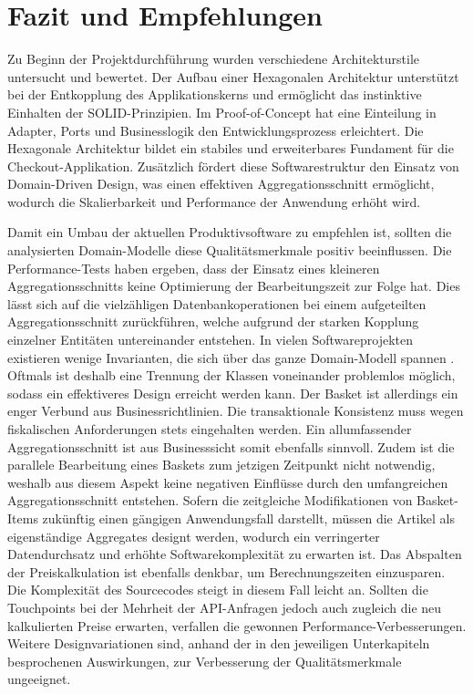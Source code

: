 

\chapter{Fazit und Empfehlungen}

Zu Beginn der Projektdurchführung wurden verschiedene Architekturstile untersucht und bewertet. Der Aufbau einer Hexagonalen Architektur unterstützt bei der Entkopplung des Applikationskerns und ermöglicht das instinktive Einhalten der SOLID-Prinzipien. Im Proof-of-Concept hat eine Einteilung in Adapter, Ports und Businesslogik den Entwicklungsprozess erleichtert. Die Hexagonale Architektur bildet ein stabiles und erweiterbares Fundament für die Checkout-Applikation. Zusätzlich fördert diese Softwarestruktur den Einsatz von Domain-Driven Design, was einen effektiven Aggregationsschnitt ermöglicht, wodurch die Skalierbarkeit und Performance der Anwendung erhöht wird. 

Damit ein Umbau der aktuellen Produktivsoftware zu empfehlen ist, sollten die analysierten Domain-Modelle diese Qualitätsmerkmale positiv beeinflussen. Die Performance-Tests haben ergeben, dass der Einsatz eines kleineren Aggregationsschnitts keine Optimierung der Bearbeitungszeit zur Folge hat. Dies lässt sich auf die vielzähligen Datenbankoperationen bei einem aufgeteilten Aggregationsschnitt zurückführen, welche aufgrund der starken Kopplung einzelner Entitäten untereinander entstehen. In vielen Softwareprojekten existieren wenige Invarianten, die sich über das ganze Domain-Modell spannen \cite[S. 355ff.]{Vernon.2015}. Oftmals ist deshalb eine Trennung der Klassen voneinander problemlos möglich, sodass ein effektiveres Design erreicht werden kann. Der Basket ist allerdings ein enger Verbund aus Businessrichtlinien. Die transaktionale Konsistenz muss wegen fiskalischen Anforderungen stets eingehalten werden. Ein allumfassender Aggregationsschnitt ist aus Businesssicht somit ebenfalls sinnvoll. Zudem ist die parallele Bearbeitung eines Baskets zum jetzigen Zeitpunkt nicht notwendig, weshalb aus diesem Aspekt keine negativen Einflüsse durch den umfangreichen Aggregationsschnitt entstehen. Sofern die zeitgleiche Modifikationen von Basket-Items zukünftig einen gängigen Anwendungsfall darstellt, müssen die Artikel als eigenständige Aggregates designt werden, wodurch ein verringerter Datendurchsatz und erhöhte Softwarekomplexität zu erwarten ist. Das Abspalten der Preiskalkulation ist ebenfalls denkbar, um Berechnungszeiten einzusparen. Die Komplexität des Sourcecodes steigt in diesem Fall leicht an. Sollten die Touchpoints bei der Mehrheit der API-Anfragen jedoch auch zugleich die neu kalkulierten Preise erwarten, verfallen die gewonnen Performance-Verbesserungen. Weitere Designvariationen sind, anhand der in den jeweiligen Unterkapiteln besprochenen Auswirkungen, zur Verbesserung der Qualitätsmerkmale ungeeignet.


